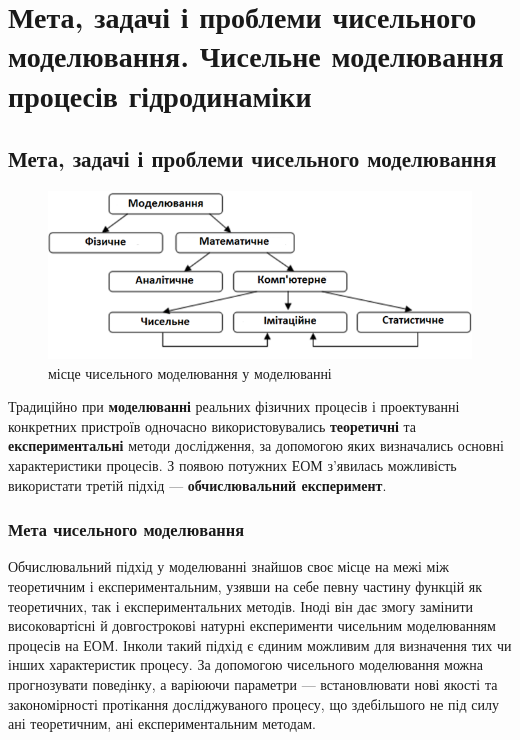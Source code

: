 \chapter{Мета, задачі і проблеми чисельного моделювання. Чисельне моделювання процесів гідродинаміки} 


\section{Мета, задачі і проблеми чисельного моделювання}

\begin{figure}[H]
    \centering
    \includegraphics[width=.8\textwidth]{img/01/1.png}
    \caption{місце чисельного моделювання у моделюванні}
\end{figure}

Традиційно при \textbf{моделюванні} реальних фізичних процесів і проектуванні конкретних пристроїв одночасно використовувались \textbf{теоретичні} та \textbf{експериментальні} методи дослідження, за допомогою яких визначались основні характеристики процесів. З появою потужних ЕОМ з'явилась можливість використати третій підхід --- \textbf{обчислювальний експеримент}.

\subsection{Мета чисельного моделювання}

Обчислювальний підхід у моделюванні знайшов своє місце на межі між теоретичним і експериментальним, узявши на себе певну частину функцій як теоретичних, так і експериментальних методів. Іноді він дає змогу замінити високовартісні й довгострокові натурні експерименти чисельним моделюванням процесів на ЕОМ. Інколи такий підхід є єдиним можливим для визначення тих чи інших характеристик процесу. За допомогою чисельного моделювання можна прогнозувати поведінку, а варіюючи параметри --- встановлювати нові якості та закономірності протікання досліджуваного процесу, що здебільшого не під силу ані теоретичним, ані експериментальним методам.


